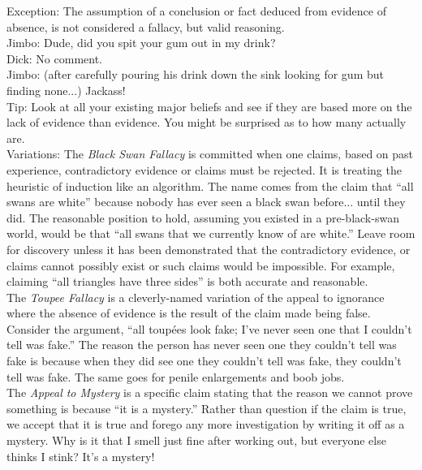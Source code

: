 \documentclass[a4paper,12pt,single,pdftex]{scrbook}
\begin{document}
{    
      Exception: The assumption of a conclusion or fact deduced from evidence of absence, is not considered a fallacy, but valid reasoning. 
    \\

    
      Jimbo: Dude, did you spit your gum out in my drink?
    \\

    
      Dick: No comment.
    \\

    
      Jimbo: (after carefully pouring his drink down the sink looking for gum but finding none...)  Jackass!
    \\

    
      Tip: Look at all your existing major beliefs and see if they are based more on the lack of evidence than evidence.  You might be surprised as to how many actually are.
    \\

    
      Variations: The {\em Black Swan Fallacy} is committed when one claims, based on past experience, contradictory evidence or claims must be rejected. It is treating the heuristic of induction like an algorithm. The name comes from the claim that “all swans are white” because nobody has ever seen a black swan before... until they did. The reasonable position to hold, assuming you existed in a pre-black-swan world, would be that “all swans that we currently know of are white.” Leave room for discovery unless it has been demonstrated that the contradictory evidence, or claims cannot possibly exist or such claims would be impossible. For example, claiming “all triangles have three sides” is both accurate and reasonable.
    \\

    
      The {\em Toupee Fallacy} is a cleverly-named variation of the appeal to ignorance where the absence of evidence is the result of the claim made being false. Consider the argument, “all toupées look fake; I've never seen one that I couldn't tell was fake.” The reason the person has never seen one they couldn’t tell was fake is because when they did see one they couldn’t tell was fake, they couldn’t tell was fake. The same goes for penile enlargements and boob jobs.
    \\

    
      The {\em Appeal to Mystery} is a specific claim stating that the reason we cannot prove something is because “it is a mystery.” Rather than question if the claim is true, we accept that it is true and forego any more investigation by writing it off as a mystery. Why is it that I smell just fine after working out, but everyone else thinks I stink? It’s a mystery!
    \\

  }
\end{document}
